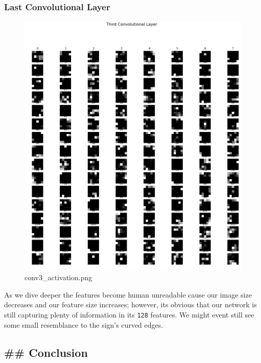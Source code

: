 \documentclass[11pt]{article}
\makeatletter
\def\maxwidth{\ifdim\Gin@nat@width>\linewidth\linewidth
    \else\Gin@nat@width\fi}
\let\Oldincludegraphics\includegraphics
\renewcommand{\includegraphics}[1]{\Oldincludegraphics[width=.8\maxwidth]{#1}}
\makeatother
\begin{document}
\hypertarget{last-convolutional-layer}{%
\subsubsection{Last Convolutional
Layer}\label{last-convolutional-layer}}

\begin{figure}
\centering
\includegraphics{./assets/conv3.png}
\caption{conv3\_activation.png}
\end{figure}

As we dive deeper the features become human unreadable cause our image
size decreases and our feature size increases; however, its obvious that
our network is still capturing plenty of information in its \texttt{128}
features. We might event still see some small resemblance to the sign's
curved edges.

    \hypertarget{conclusion}{%
\subsection{\#\# Conclusion}\label{conclusion}}
\end{document}

